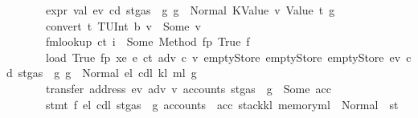 \begin{isabellebody}
\ \ \ \ \ \ \ {\isachardoublequoteopen}expr\ val\ ev\ cd\ {\isacharparenleft}{\kern0pt}st{\isasymlparr}gas\ {\isacharcolon}{\kern0pt}{\isacharequal}{\kern0pt}\ g{\isasymrparr}{\isacharparenright}{\kern0pt}\ g\ {\isacharequal}{\kern0pt}\ Normal\ {\isacharparenleft}{\kern0pt}{\isacharparenleft}{\kern0pt}KValue\ v{\isacharcomma}{\kern0pt}\ Value\ t{\isacharparenright}{\kern0pt}{\isacharcomma}{\kern0pt}\ g{\isacharprime}{\kern0pt}{\isacharparenright}{\kern0pt}{\isachardoublequoteclose}\isanewline
\ \ \ \ \ \ \ {\isachardoublequoteopen}convert\ t\ {\isacharparenleft}{\kern0pt}TUInt\ b{}{}{}{\isacharparenright}{\kern0pt}\ v\ {\isacharequal}{\kern0pt}\ Some\ v{\isacharprime}{\kern0pt}{\isachardoublequoteclose}\isanewline
\ \ \ \ \ \ \ {\isachardoublequoteopen}fmlookup\ ct\ i\ {\isacharequal}{\kern0pt}\ Some\ {\isacharparenleft}{\kern0pt}Method\ {\isacharparenleft}{\kern0pt}fp{\isacharcomma}{\kern0pt}\ True{\isacharcomma}{\kern0pt}\ f{\isacharparenright}{\kern0pt}{\isacharparenright}{\kern0pt}{\isachardoublequoteclose}\isanewline
\ \ \ \ \ \ \ {\isachardoublequoteopen}load\ True\ fp\ xe\ {\isacharparenleft}{\kern0pt}e{\isacharprime}{\kern0pt}\ ct\ adv\ c\ v{\isacharprime}{\kern0pt}{\isacharparenright}{\kern0pt}\ emptyStore\ emptyStore\ emptyStore\ ev\ cd\ {\isacharparenleft}{\kern0pt}st{\isasymlparr}gas\ {\isacharcolon}{\kern0pt}{\isacharequal}{\kern0pt}\ g{\isacharprime}{\kern0pt}{\isasymrparr}{\isacharparenright}{\kern0pt}\ g{\isacharprime}{\kern0pt}\ {\isacharequal}{\kern0pt}\ Normal\ {\isacharparenleft}{\kern0pt}{\isacharparenleft}{\kern0pt}e\isactrlsub l{\isacharcomma}{\kern0pt}\ cd\isactrlsub l{\isacharcomma}{\kern0pt}\ k\isactrlsub l{\isacharcomma}{\kern0pt}\ m\isactrlsub l{\isacharparenright}{\kern0pt}{\isacharcomma}{\kern0pt}\ g{\isacharprime}{\kern0pt}{\isacharprime}{\kern0pt}{\isacharparenright}{\kern0pt}{\isachardoublequoteclose}\isanewline
\ \ \ \ \ \ \ {\isachardoublequoteopen}transfer\ {\isacharparenleft}{\kern0pt}address\ ev{\isacharparenright}{\kern0pt}\ adv\ v{\isacharprime}{\kern0pt}\ {\isacharparenleft}{\kern0pt}accounts\ {\isacharparenleft}{\kern0pt}st{\isasymlparr}gas\ {\isacharcolon}{\kern0pt}{\isacharequal}{\kern0pt}\ g{\isacharprime}{\kern0pt}{\isacharprime}{\kern0pt}{\isasymrparr}{\isacharparenright}{\kern0pt}{\isacharparenright}{\kern0pt}\ {\isacharequal}{\kern0pt}\ Some\ acc{\isachardoublequoteclose}\isanewline
\ \ \ \ \ \ \ {\isachardoublequoteopen}stmt\ f\ e\isactrlsub l\ cd\isactrlsub l\ {\isacharparenleft}{\kern0pt}st{\isasymlparr}gas\ {\isacharcolon}{\kern0pt}{\isacharequal}{\kern0pt}\ g{\isacharprime}{\kern0pt}{\isacharprime}{\kern0pt}{\isacharcomma}{\kern0pt}\ accounts\ {\isacharcolon}{\kern0pt}{\isacharequal}{\kern0pt}\ acc{\isacharcomma}{\kern0pt}\ stack{\isacharcolon}{\kern0pt}{\isacharequal}{\kern0pt}k\isactrlsub l{\isacharcomma}{\kern0pt}\ memory{\isacharcolon}{\kern0pt}{\isacharequal}{\kern0pt}m\isactrlsub l{\isasymrparr}{\isacharparenright}{\kern0pt}\ {\isacharequal}{\kern0pt}\ Normal\ {\isacharparenleft}{\kern0pt}{\isacharparenleft}{\kern0pt}{\isacharparenright}{\kern0pt}{\isacharcomma}{\kern0pt}\ st{\isacharprime}{\kern0pt}{\isacharprime}{\kern0pt}{\isacharparenright}{\kern0pt}{\isachardoublequoteclose}\isanewline

\end{isabellebody}

